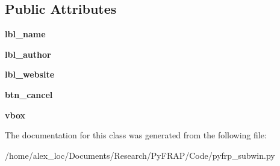 \subsection*{Public Attributes}
\begin{DoxyCompactItemize}
\item 
\hypertarget{classpyfrp__subwin_1_1about__dialog_a177c3f25afed3cf54a55c44859e026d8}{{\bfseries lbl\+\_\+name}}\label{classpyfrp__subwin_1_1about__dialog_a177c3f25afed3cf54a55c44859e026d8}

\item 
\hypertarget{classpyfrp__subwin_1_1about__dialog_a03731321535589d871c232d24d71e439}{{\bfseries lbl\+\_\+author}}\label{classpyfrp__subwin_1_1about__dialog_a03731321535589d871c232d24d71e439}

\item 
\hypertarget{classpyfrp__subwin_1_1about__dialog_ab773f260bf593aeb2993ed1ea425ba8a}{{\bfseries lbl\+\_\+website}}\label{classpyfrp__subwin_1_1about__dialog_ab773f260bf593aeb2993ed1ea425ba8a}

\item 
\hypertarget{classpyfrp__subwin_1_1about__dialog_a77fce1160b4d997525d3e03201e27c77}{{\bfseries btn\+\_\+cancel}}\label{classpyfrp__subwin_1_1about__dialog_a77fce1160b4d997525d3e03201e27c77}

\item 
\hypertarget{classpyfrp__subwin_1_1about__dialog_a7732047e1d9096b48f17dd23c2a73ce6}{{\bfseries vbox}}\label{classpyfrp__subwin_1_1about__dialog_a7732047e1d9096b48f17dd23c2a73ce6}

\end{DoxyCompactItemize}


The documentation for this class was generated from the following file\+:\begin{DoxyCompactItemize}
\item 
/home/alex\+\_\+loc/\+Documents/\+Research/\+Py\+F\+R\+A\+P/\+Code/pyfrp\+\_\+subwin.\+py\end{DoxyCompactItemize}
